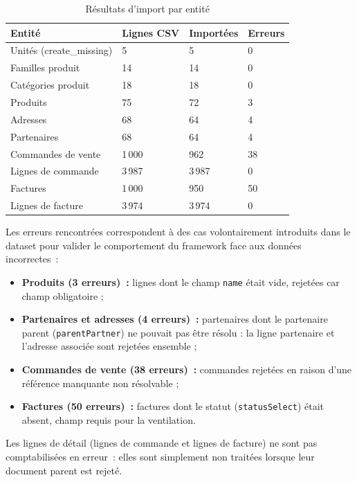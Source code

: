 \begin{table}[H]
  \centering
  \renewcommand{\arraystretch}{1.4}
  \begin{tabular}{p{4cm} p{2.5cm} p{2.5cm} p{4cm}}
    \toprule
    \rowcolor{gray!20}
    \textbf{Entité} & \textbf{Lignes CSV} & \textbf{Importées} & \textbf{Erreurs} \\
    \midrule
    \rowcolor{gray!5}
    Unités (create\_missing) & 5  & 5  & 0 \\
    Familles produit         & 14 & 14 & 0 \\
    \rowcolor{gray!5}
    Catégories produit       & 18 & 18 & 0 \\
    Produits                 & 75 & 72 & 3 \\
    \rowcolor{gray!5}
    Adresses                 & 68 & 64 & 4 \\
    Partenaires              & 68 & 64 & 4 \\
    \rowcolor{gray!5}
    Commandes de vente       & 1\,000 & 962 & 38 \\
    Lignes de commande       & 3\,987 & 3\,987 & 0 \\
    \rowcolor{gray!5}
    Factures                 & 1\,000 & 950 & 50 \\
    Lignes de facture        & 3\,974 & 3\,974 & 0 \\
    \bottomrule
  \end{tabular}
  \caption{Résultats d'import par entité}
  \label{tab:resultats-import}
\end{table}

Les erreurs rencontrées correspondent à des cas volontairement introduits dans le dataset pour valider le comportement du framework face aux données incorrectes~:
\begin{itemize}
    \item \textbf{Produits (3 erreurs)~:} lignes dont le champ \texttt{name} était vide, rejetées car champ obligatoire ;
    \item \textbf{Partenaires et adresses (4 erreurs)~:} partenaires dont le partenaire parent (\texttt{parentPartner}) ne pouvait pas être résolu : la ligne partenaire et l'adresse associée sont rejetées ensemble ;
    \item \textbf{Commandes de vente (38 erreurs)~:} commandes rejetées en raison d'une référence manquante non résolvable ;
    \item \textbf{Factures (50 erreurs)~:} factures dont le statut (\texttt{statusSelect}) était absent, champ requis pour la ventilation.
\end{itemize}
Les lignes de détail (lignes de commande et lignes de facture) ne sont pas comptabilisées en erreur~: elles sont simplement non traitées lorsque leur document parent est rejeté.

